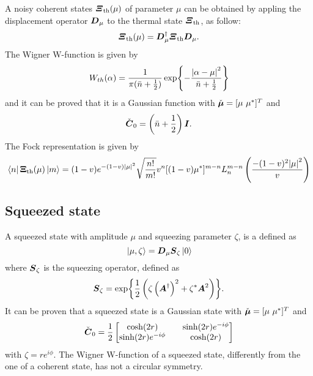         A noisy coherent states $\Operator{\varXi}_{\mathrm{th}}(\mu)$ of parameter $\mu$ can be obtained by 
        appling the displacement operator $\Operator{D}_\mu$ to the thermal state $\Operator{\varXi}_{\mathrm{th}}$,
        as follow:
        \begin{equation}
            \Operator{\varXi}_{\mathrm{th}}(\mu)=\Operator{D}_\mu^\dagger \Operator{\varXi}_{\mathrm{th}} \Operator{D}_\mu.
        \end{equation}
        The Wigner W-function is given by \cite{QuantumNoise}
        \begin{equation}
            W_{th}(\alpha)=\frac{1}{\pi(\bar{n}+\frac{1}{2})}\exp{-\frac{\absolutevalue{\alpha-\mu}^2}
            {\bar{n}+\frac{1}{2}}}
            \label{WignerNCS}
        \end{equation}
        and it can be proved that it is a Gaussian function with $\check{\Vector{\mu}}=[\mu\ \mu^*]^T$
        and
        \begin{equation*}
            \check{\Operator{C}}_0=\left(\bar{n}+\frac{1}{2}\right)\Operator{I}.
        \end{equation*}
        The Fock representation is given by
        \begin{equation}
            \bra{n}\Operator{\Xi}_{\mathrm{th}}(\mu)\ket{m}=(1-v)e^{-(1-v)\absolutevalue{\mu}^2}\sqrt{\frac{n!}{m!}}
            v^n[(1-v)\mu^*]^{m-n}L_n^{m-n}\left(\frac{-(1-v)^2\absolutevalue{\mu}^2}{v}\right)
            \label{eq:FRCS}
        \end{equation}

    \subsection{Squeezed state}
        \label{squeezedStates}
        A squeezed state with amplitude $\mu$ and squeezing parameter $\zeta$, is a defined as 
        \cite{tesiGuerrini,YuenRadField,QMnoiseInterf}
        \begin{equation}
            \ket*{\mu,\zeta}=\Operator{D}_\mu\Operator{S}_\zeta\ket{0}
        \end{equation}
        where $\Operator{S}_\zeta$ is the squeezing operator, defined as
        \begin{equation}
            \Operator{S}_\zeta=\exp{\frac{1}{2}\left(\zeta\left(\Operator{A}^\dagger\right)^2+
            \zeta^*\Operator{A}^2\right)}.
        \end{equation}
        It can be proven that a squeezed state is a Gaussian state with $\check{\Vector{\mu}}=[\mu\ \mu^*]^T$
        and
        \begin{equation*}
            \check{\Operator{C}}_0=\frac{1}{2}
            \begin{bmatrix}
                \cosh(2r) && \sinh(2r)e^{-i\phi}\\
                \sinh(2r)e^{-i\phi} && \cosh(2r)
            \end{bmatrix}
        \end{equation*}
        with $\zeta=re^{i\phi}$.
        The Wigner W-function of a squeezed state, differently from the one of a coherent state, has not a 
        circular symmetry.

